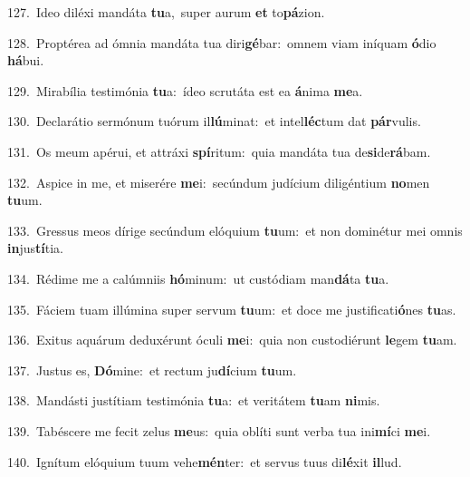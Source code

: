 {\numbfont\textcolor{\numbcolor}{127.}}~Ideo diléxi mandáta \textbf{tu}\-a,~\star super aurum \textbf{et} to\-\textbf{pá}\-zion.\par
{\numbfont\textcolor{\numbcolor}{128.}}~Proptérea ad ómnia mandáta tua diri\-\textbf{gé}\-bar:~\star omnem viam iníquam \textbf{ó}\-dio \textbf{há}\-bui.\par
{\numbfont\textcolor{\numbcolor}{129.}}~Mirabília testimónia \textbf{tu}\-a:~\star ídeo scrutáta est ea \textbf{á}\-nima \textbf{me}\-a.\par
{\numbfont\textcolor{\numbcolor}{130.}}~Declarátio sermónum tuórum il\-\textbf{lú}\-minat:~\star et intel\-\textbf{léc}\-tum dat \textbf{pár}\-vulis.\par
{\numbfont\textcolor{\numbcolor}{131.}}~Os meum apérui, et attráxi \textbf{spí}\-ritum:~\star quia mandáta tua de\-\textbf{si}\-de\-\textbf{rá}\-bam.\par
{\numbfont\textcolor{\numbcolor}{132.}}~Aspice in me, et miserére \textbf{me}\-i:~\star secúndum judícium diligéntium \textbf{no}\-men \textbf{tu}\-um.\par
{\numbfont\textcolor{\numbcolor}{133.}}~Gressus meos dírige secúndum elóquium \textbf{tu}\-um:~\star et non dominétur mei omnis \textbf{in}\-jus\-\textbf{tí}\-tia.\par
{\numbfont\textcolor{\numbcolor}{134.}}~Rédime me a calúmniis \textbf{hó}\-minum:~\star ut custódiam man\-\textbf{dá}\-ta \textbf{tu}\-a.\par
{\numbfont\textcolor{\numbcolor}{135.}}~Fáciem tuam illúmina super servum \textbf{tu}\-um:~\star et doce me justificati\-\textbf{ó}\-nes \textbf{tu}\-as.\par
{\numbfont\textcolor{\numbcolor}{136.}}~Exitus aquárum deduxérunt óculi \textbf{me}\-i:~\star quia non custodiérunt \textbf{le}\-gem \textbf{tu}\-am.\par
{\numbfont\textcolor{\numbcolor}{137.}}~Justus es, \textbf{Dó}\-mine:~\star et rectum ju\-\textbf{dí}\-cium \textbf{tu}\-um.\par
{\numbfont\textcolor{\numbcolor}{138.}}~Mandásti justítiam testimónia \textbf{tu}\-a:~\star et veritátem \textbf{tu}\-am \textbf{ni}\-mis.\par
{\numbfont\textcolor{\numbcolor}{139.}}~Tabéscere me fecit zelus \textbf{me}\-us:~\star quia oblíti sunt verba tua ini\-\textbf{mí}\-ci \textbf{me}\-i.\par
{\numbfont\textcolor{\numbcolor}{140.}}~Ignítum elóquium tuum vehe\-\textbf{mén}\-ter:~\star et servus tuus di\-\textbf{lé}\-xit \textbf{il}\-lud.\par
